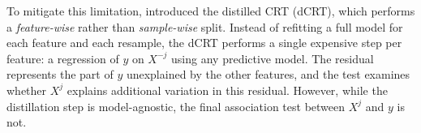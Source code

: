 \documentclass{article}
\theoremstyle{plain}
\theoremstyle{definition}
\theoremstyle{remark}
\begin{document}

To mitigate this limitation, \citet{liu2022fast} introduced the distilled CRT (dCRT), which performs a \emph{feature-wise} rather than \emph{sample-wise} split. Instead of refitting a full model for each feature and each resample, the dCRT performs a single expensive step per feature: a regression of $y$ on $X^{-j}$ using any predictive model. The residual represents the part of $y$ unexplained by the other features, and the test examines whether $X^j$ explains additional variation in this residual. However, while the distillation step is model-agnostic, the final association test between $X^j$ and $y$ is not.




\end{document}
